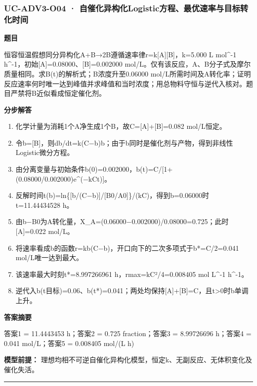 \documentclass[UTF8,11pt,a4paper]{ctexart}
\begin{document}
\subsubsection*{UC-ADV3-O04 · 自催化异构化Logistic方程、最优速率与目标转化时间}
\noindent\textbf{题目}\par
恒容恒温假想同分异构化A+B→2B遵循速率律r=k[A][B]，k=5.000 L mol\textasciicircum{}-1 h\textasciicircum{}-1，初始[A]=0.08000、[B]=0.002000 mol/L。仅有该反应，A、B分子式及摩尔质量相同。求B(t)的解析式；B浓度升至0.06000 mol/L所需时间及A转化率；证明反应速率何时唯一达到峰值并求峰值和当时浓度；用总物料守恒与逆代入核对。题目严禁将B近似看成恒定催化剂。\par
\medskip\noindent\textbf{分步解答}
\begin{enumerate}
\item 化学计量为消耗1个A净生成1个B，故C=[A]+[B]=0.082 mol/L恒定。
\item 令b=[B]，则db/dt=k(C−b)b；由于b同时是催化剂与产物，得到非线性Logistic微分方程。
\item 由分离变量与初始条件b(0)=0.002000，b(t)=C/[1+(0.08000/0.002000)e\textasciicircum{}(−kCt)]。
\item 反解时间t(b)=ln\{[b/(C−b)]/[B0/A0]\}/(kC)，得到b=0.06000时t=11.44434528 h。
\item 由b−B0为A转化量，X\_A=(0.06000−0.002000)/0.08000=0.725；此时[A]=0.022 mol/L。
\item 将速率看成b的函数r=kb(C−b)，开口向下的二次多项式于b*=C/2=0.041 mol/L唯一达到最大。
\item 该速率最大时刻t*=8.997266961 h，rmax=kC²/4=0.008405 mol L\textasciicircum{}-1 h\textasciicircum{}-1。
\item 逆代入b(t目标)=0.06、b(t*)=0.041；两处均保持[A]+[B]=C，且t>0时b单调上升。
\end{enumerate}
\noindent\textbf{答案摘要}\par
答案1 = 11.4443453 h；答案2 = 0.725 fraction；答案3 = 8.99726696 h；答案4 = 0.041 mol/L；答案5 = 0.008405 mol/(L h)\par
\noindent\textbf{模型前提：}
理想均相不可逆自催化异构化模型，恒定k、无副反应、无体积变化及催化失活。\par
\medskip\hrule\medskip
{}
\end{document}
